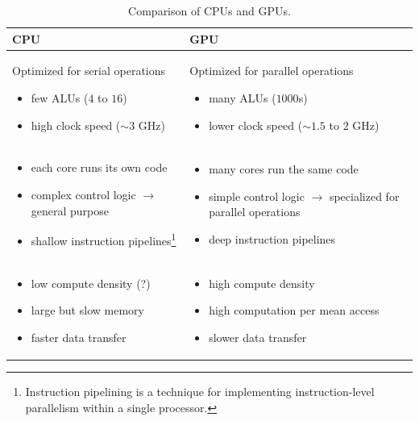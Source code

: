 \begin{table}
    \centering
    \begin{tabular}{|p{}|p{}|}
        \hline
        \textbf{CPU} & \textbf{GPU} \\
        \hline
        Optimized for serial operations
        \begin{itemize}
            \item few ALUs ($4$ to $16$)
            \item high clock speed ($\sim 3$ GHz)
        \end{itemize} & Optimized for parallel operations
        \begin{itemize}
            \item many ALUs ($1000$s)
            \item lower clock speed ($\sim 1.5$ to $2$ GHz)
        \end{itemize} \\
        \hline
        \begin{itemize}
            \item each core runs its own code
            \item complex control logic $\rightarrow$ general purpose
            \item shallow instruction pipelines\footnote{Instruction pipelining is a technique for implementing instruction-level parallelism within a single processor.}
        \end{itemize} & \begin{itemize}
            \item many cores run the same code
            \item simple control logic $\rightarrow$ specialized for parallel operations
            \item deep instruction pipelines
        \end{itemize} \\
        \hline
        \begin{itemize}
            \item low compute density (?)
            \item large but slow memory
            \item faster data transfer
        \end{itemize} & \begin{itemize}
            \item high compute density
            \item high computation per mean access
            \item slower data transfer
        \end{itemize} \\
        \hline
    \end{tabular}
    \caption{Comparison of CPUs and GPUs.}
    \label{tab:cpu_gpu}
\end{table}

